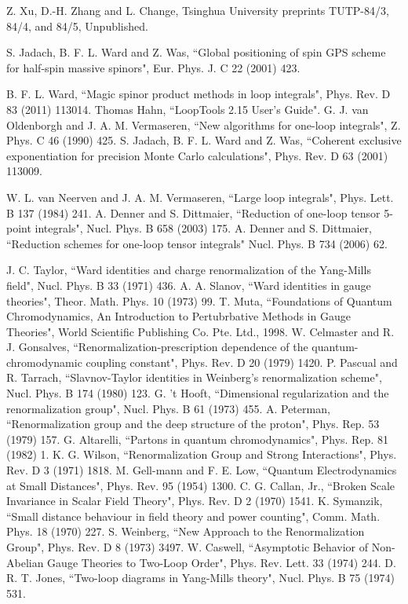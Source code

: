 \documentclass
[
]
{thesis}
\begin{document}
\begin{thebibliography}{widestlabel}
	 Z. Xu, D.-H. Zhang and L. Change, Tsinghua University preprints TUTP-84/3, 84/4, and 84/5, Unpublished.
	
	 S. Jadach, B. F. L. Ward and Z. Was, ``Global positioning of spin GPS scheme for half-spin massive spinors", Eur. Phys. J. C 22 (2001) 423.
	
	
	 B. F. L. Ward, ``Magic spinor product methods in loop integrals", Phys. Rev. D 83 (2011) 113014.
	 Thomas Hahn, ``LoopTools 2.15 User's Guide".
	 G. J. van Oldenborgh and J. A. M. Vermaseren, ``New algorithms for one-loop integrals", Z. Phys. C 46 (1990) 425.
	 S. Jadach, B. F. L. Ward and Z. Was, ``Coherent exclusive exponentiation for precision Monte Carlo calculations", Phys. Rev. D 63 (2001) 113009.
	
	 W. L. van Neerven and J. A. M. Vermaseren, ``Large loop integrals", Phys. Lett. B 137 (1984) 241.
	 A. Denner and S. Dittmaier, ``Reduction of one-loop tensor 5-point integrals", Nucl. Phys. B 658 (2003) 175.
	 A. Denner and S. Dittmaier, ``Reduction schemes for one-loop tensor integrals" Nucl. Phys. B 734 (2006) 62.
	
	 J. C. Taylor, ``Ward identities and charge renormalization of the Yang-Mills field", Nucl. Phys. B 33 (1971) 436.
	 A. A. Slanov, ``Ward identities in gauge theories", Theor. Math. Phys. 10 (1973) 99.
	 T. Muta, ``Foundations of Quantum Chromodynamics, An Introduction to Pertubrbative Methods in Gauge Theories", World Scientific Publishing Co. Pte. Ltd., 1998.
	 W. Celmaster and R. J. Gonsalves, ``Renormalization-prescription dependence of the quantum-chromodynamic coupling constant", Phys. Rev. D 20 (1979) 1420. 
	 P. Pascual and R. Tarrach, ``Slavnov-Taylor identities in Weinberg's renormalization scheme", Nucl. Phys. B 174 (1980) 123.
	 G. 't Hooft, ``Dimensional regularization and the renormalization group", Nucl. Phys. B 61 (1973) 455.
	 A. Peterman, ``Renormalization group and the deep structure of the proton", Phys. Rep. 53 (1979) 157.
	 G. Altarelli, ``Partons in quantum chromodynamics", Phys. Rep. 81 (1982) 1.
	 K. G. Wilson, ``Renormalization Group and Strong Interactions", Phys. Rev. D 3 (1971) 1818.
	 M. Gell-mann and F. E. Low, ``Quantum Electrodynamics at Small Distances", Phys. Rev. 95 (1954) 1300.
	 C. G. Callan, Jr., ``Broken Scale Invariance in Scalar Field Theory", Phys. Rev. D 2 (1970) 1541.
	 K. Symanzik, ``Small distance behaviour in field theory and power counting", Comm. Math. Phys. 18 (1970) 227.
	 S. Weinberg, ``New Approach to the Renormalization Group", Phys. Rev. D 8 (1973) 3497.
	 W. Caswell, ``Asymptotic Behavior of Non-Abelian Gauge Theories to Two-Loop Order", Phys. Rev. Lett. 33 (1974) 244.
	 D. R. T. Jones, ``Two-loop diagrams in Yang-Mills theory", Nucl. Phys. B 75 (1974) 531.
	

\end{thebibliography}
\end{document}
